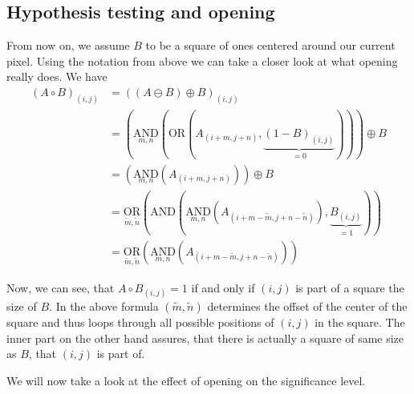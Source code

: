 \documentclass[a4paper,12pt]{article}
\theoremstyle{plain}
\theoremstyle{definition}
\theoremstyle{remark}
\begin{document}
	\subsection{Hypothesis testing and opening}
	
	From now on, we assume $B$ to be a square of ones centered around our current pixel. Using the notation from above we can take a closer look at what opening really does. We have
	\begin{align*}
		(A \circ B)_{(i, j)} &= ((A \ominus B) \oplus B)_{(i, j)} \\
		&= \left( \underset{m, n}{\mathrm{AND}} \left( \mathrm{OR} (A_{(i + m, j + n)}, \underbrace{(1 - B)_{(i, j)}}_{= 0} ) \right) \right) \oplus B \\
		&= \left( \underset{m, n}{\mathrm{AND}} ( A_{(i + m, j + n)} ) \right) \oplus B \\
		&= \underset{\tilde{m}, \tilde{n}}{\mathrm{OR}} \left( \mathrm{AND} \left( \underset{m, n}{\mathrm{AND}} ( A_{(i + m - \tilde{m}, j + n - \tilde{n})} ), \underbrace{B_{(i, j)}}_{= 1} \right) \right) \\
		&= \underset{\tilde{m}, \tilde{n}}{\mathrm{OR}} \left( \underset{m, n}{\mathrm{AND}} ( A_{(i + m - \tilde{m}, j + n - \tilde{n})} ) \right)
	\end{align*}
	
	Now, we can see, that $A \circ B_{(i, j)} = 1$ if and only if $(i, j)$ is part of a square the size of $B$. In the above formula $(\tilde{m}, \tilde{n})$ determines the offset of the center of the square and thus loops through all possible positions of $(i, j)$ in the square. The inner part on the other hand assures, that there is actually a square of same size as $B$, that $(i, j)$ is part of.
	
	We will now take a look at the effect of opening on the significance level.
	
\end{document}
